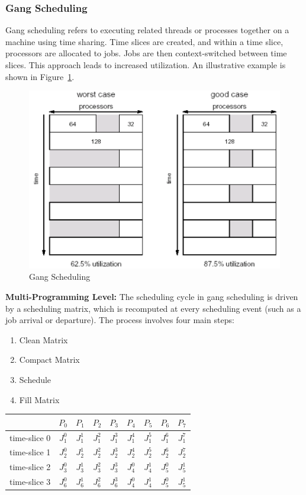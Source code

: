 \documentclass[12pt]{book}
\begin{document}
\subsubsection{Gang Scheduling}
Gang scheduling refers to executing related threads or processes together on a machine using time sharing. 
Time slices are created, and within a time slice, processors are allocated to jobs. 
Jobs are then context-switched between time slices. 
This approach leads to increased utilization. 
An illustrative example is shown in Figure~\ref{fig:gangsched}.
\begin{figure}
    \centering
    \includegraphics[width=0.5\linewidth]{images/gangsched.png}
    \caption{Gang Scheduling}
    \label{fig:gangsched}
\end{figure}
\textbf{Multi-Programming Level:}  
The scheduling cycle in gang scheduling is driven by a scheduling matrix, which is recomputed at every scheduling event (such as a job arrival or departure).  
The process involves four main steps:  
\begin{enumerate}
    \item Clean Matrix
    \item Compact Matrix
    \item Schedule
    \item Fill Matrix
\end{enumerate}

\begin{table}[ht]
    \centering
    \begin{tabular}{c|c|c|c|c|c|c|c|c|}
         & $P_0$ & $P_1$ & $P_2$ & $P_3$ & $P_4$ & $P_5$ & $P_6$ & $P_7$\\
         \hline
        time-slice 0 & $J_1^0$ & $J_1^1$ & $J_1^2$ & $J_1^3$ & $J_1^4$ & $J_1^5$ & $J_1^6$ & $J_1^7$\\
        \hline
        time-slice 1 & $J_2^0$ & $J_2^1$ & $J_2^2$ & $J_2^3$ & $J_2^4$ & $J_2^5$ & $J_2^6$ & $J_2^7$\\
        \hline
        time-slice 2 & $J_3^0$ & $J_3^1$ & $J_3^2$ & $J_3^3$ & $J_4^0$ & $J_4^1$ & $J_5^0$ & $J_5^1$\\
        \hline
        time-slice 3 & $J_6^0$ & $J_6^1$ & $J_6^2$ & $J_6^3$ & $J_4^0$ & $J_4^1$ & $J_5^0$ & $J_5^1$\\
        \hline
    \end{tabular}
\end{table}
\end{document}
